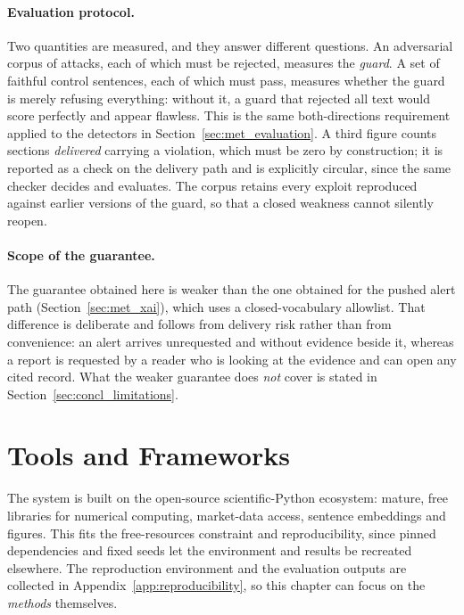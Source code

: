 \paragraph{Evaluation protocol.} Two quantities are measured, and they answer different questions.
An adversarial corpus of attacks, each of which must be rejected, measures the \emph{guard}. A set of
faithful control sentences, each of which must pass, measures whether the guard is merely refusing
everything: without it, a guard that rejected all text would score perfectly and appear flawless.
This is the same both-directions requirement applied to the detectors in
Section~\ref{sec:met_evaluation}. A third figure counts sections \emph{delivered} carrying a
violation, which must be zero by construction; it is reported as a check on the delivery path and is
explicitly circular, since the same checker decides and evaluates. The corpus retains every exploit
reproduced against earlier versions of the guard, so that a closed weakness cannot silently reopen.

\paragraph{Scope of the guarantee.} The guarantee obtained here is weaker than the one obtained for
the pushed alert path (Section~\ref{sec:met_xai}), which uses a closed-vocabulary allowlist. That
difference is deliberate and follows from delivery risk rather than from convenience: an alert
arrives unrequested and without evidence beside it, whereas a report is requested by a reader who is
looking at the evidence and can open any cited record. What the weaker guarantee does \emph{not}
cover is stated in Section~\ref{sec:concl_limitations}.

\section{Tools and Frameworks}
\label{sec:met_tools}

The system is built on the open-source scientific-Python ecosystem: mature, free libraries for numerical
computing, market-data access, sentence embeddings and figures. This fits the free-resources constraint and
reproducibility, since pinned dependencies and fixed seeds let the environment and results be recreated
elsewhere. The reproduction environment and the evaluation outputs are collected in
Appendix~\ref{app:reproducibility}, so this chapter can focus on the \emph{methods} themselves.

